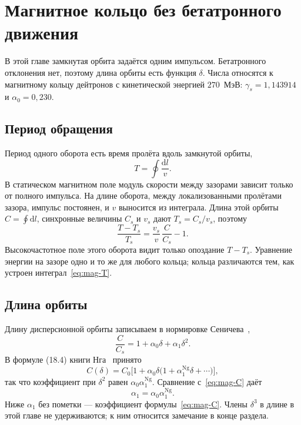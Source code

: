 \section{Магнитное кольцо без бетатронного движения}
\label{sec:magnetic}

В этой главе замкнутая орбита задаётся одним импульсом. Бетатронного отклонения нет, поэтому длина орбиты есть функция $\delta$. Числа относятся к магнитному кольцу дейтронов с кинетической энергией $270$~МэВ: $\gamma_s=1{,}143914$ и $\alpha_0=0{,}230$.

\subsection{Период обращения}
\label{sec:period}

Период одного оборота есть время пролёта вдоль замкнутой орбиты,
\begin{equation}
\label{eq:mag-T}
T=\oint\frac{\mathrm{d}l}{v}.
\end{equation}
В статическом магнитном поле модуль скорости между зазорами зависит только от полного импульса. На длине оборота, между локализованными пролётами зазора, импульс постоянен, и $v$ выносится из интеграла. Длина этой орбиты $C=\oint\mathrm{d}l$, синхронные величины $C_s$ и $v_s$ дают $T_s=C_s/v_s$, поэтому
\begin{equation}
\label{eq:mag-Tratio}
\frac{T-T_s}{T_s}
=\frac{v_s}{v}\,\frac{C}{C_s}-1.
\end{equation}
Высокочастотное поле этого оборота видит только опоздание $T-T_s$. Уравнение энергии на зазоре одно и то же для любого кольца; кольца различаются тем, как устроен интеграл~\eqref{eq:mag-T}.

\subsection{Длина орбиты}
\label{sec:length}

Длину дисперсионной орбиты записываем в нормировке Сеничева~\cite{Senichev2013},
\begin{equation}
\label{eq:mag-C}
\frac{C}{C_s}=1+\alpha_0\delta+\alpha_1\delta^2.
\end{equation}
В формуле (18.4) книги Нга~\cite{Ng2006} принято
\begin{equation}
\label{eq:mag-Cng}
C(\delta)=C_0\bigl[1+\alpha_0\delta\bigl(1+\alpha_1^{\mathrm{Ng}}\delta+\cdots\bigr)\bigr],
\end{equation}
так что коэффициент при $\delta^2$ равен $\alpha_0\alpha_1^{\mathrm{Ng}}$. Сравнение с~\eqref{eq:mag-C} даёт
\begin{equation}
\label{eq:mag-alpha-ng}
\alpha_1=\alpha_0\alpha_1^{\mathrm{Ng}}.
\end{equation}
Ниже $\alpha_1$ без пометки --- коэффициент формулы~\eqref{eq:mag-C}. Члены $\delta^3$ в длине в этой главе не удерживаются; к ним относится замечание в конце раздела.

